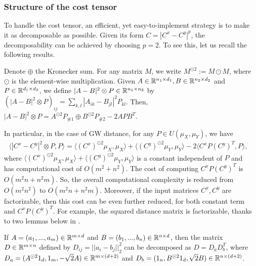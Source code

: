 \subsubsection{Structure of the cost tensor}
To handle the cost tensor, an efficient, yet easy-to-implement strategy is to make it
as decomposable as possible. Given its form $C = |C^x - C^y|^p$, the decomposability
can be achieved by choosing $p=2$. To see this, let us recall the following results.
\begin{lemma}
  \label{lemma_peyre16}
Denote $\oplus$ the Kronecker sum.
For any matrix $M$, we write $M^{\odot 2} := M \odot M$, where $\odot$
is the element-wise multiplication. Given $A \in \mathbb R^{n_1 \times d_1},
B \in \mathbb R^{n_2 \times d_2}$ and $P \in \mathbb R^{d_1 \times d_2}$, we define
$\vert A - B \vert^2 \otimes P \in \mathbb R^{n_1 \times n_2}$ by
$(\vert A - B \vert^2 \otimes P)_{ij} = \sum_{k,l } |A_{ik} - B_{jl}|^2 P_{kl}$.
Then, $\vert A - B \vert^2 \otimes P = A^{\odot 2} P_{\# 1} \oplus B^{\odot 2} P_{\# 2} - 2 A P B^T$.
\end{lemma}
In particular, in the case of GW distance, for any $P \in U(\mu_X, \mu_Y)$, we have
\begin{align}
  \label{eq:cost_tensor_full}
  \langle |C^x - C^y|^2 \otimes P, P \rangle
  = \langle (C^x)^{\odot 2} \mu_X, \mu_X \rangle + \langle (C^y)^{\odot 2} \mu_Y, \mu_Y \rangle
  - 2 \langle C^x P (C^y)^T, P \rangle,
\end{align}
where $\langle (C^x)^{\odot 2} \mu_X, \mu_X \rangle + \langle (C^y)^{\odot 2} \mu_Y, \mu_Y \rangle$
is a constant independent of $P$ and has computational cost of $O(m^2 + n^2)$.
The cost of computing $C^x P (C^y)^T$ is $O(m^2 n + n^2m)$.
So, the overall computational complexity is reduced from $O(m^2 n^2)$ to $O(m^2 n + n^2 m)$.
Moreover, if the input matrices $C^x, C^y$ are factorizable,
then this cost can be even further reduced, for both constant term and $C^x P (C^y)^T$.
For example, the squared distance matrix is factorizable,
thanks to two lemmas below in \citep{Meyer21b}.
\begin{lemma}
  If $A = (a_1,...,a_m) \in \mathbb R^{m \times d}$ and $B = (b_1,...,b_n) \in \mathbb R^{n \times d}$,
then the matrix $D \in \mathbb R^{m \times n}$ defined by
$D_{ij} = \vert\vert a_i - b_j \vert\vert_2^2$ can be decomposed as $D = D_a D_b^T$, where
$D_a = (A^{\odot 2} 1_d, 1_m, -\sqrt{2} A) \in \mathbb R^{m \times (d+2)}$ and
$D_b = (1_n, B^{\odot 2} 1_d, \sqrt{2} B) \in \mathbb R^{n \times (d+2)}$.
\end{lemma}
